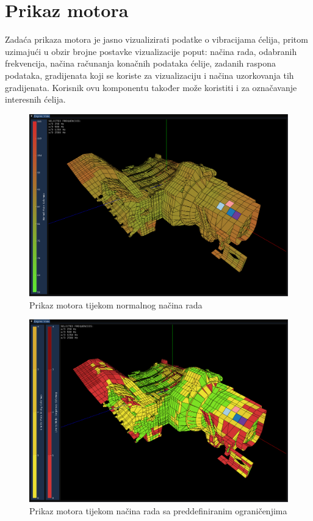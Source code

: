 \documentclass[times, utf8, diplomski]{fer}
\begin{document}
\section{Prikaz motora} \label{engine-view-section}
Zadaća prikaza motora je jasno vizualizirati podatke o vibracijama ćelija, pritom uzimajući u obzir brojne postavke vizualizacije poput: načina rada, odabranih frekvencija, načina računanja konačnih podataka ćelije, zadanih raspona podataka, gradijenata koji se koriste za vizualizaciju i načina uzorkovanja tih gradijenata. Korisnik ovu komponentu također može koristiti i za označavanje interesnih ćelija.\\
\begin{figure}[H]
\centering
\includegraphics[width=0.85\linewidth]{engine_view_normal_mode.png}
\caption{Prikaz motora tijekom normalnog načina rada}
\label{fig:normal-mode-engine-view}
\end{figure}
\begin{figure}[h]
\centering
\includegraphics[width=0.85\linewidth]{engine_view_limits.png}
\caption{Prikaz motora tijekom načina rada sa preddefiniranim ograničenjima}
\label{fig:limits-mode-engine-view}
\end{figure}
\end{document}
